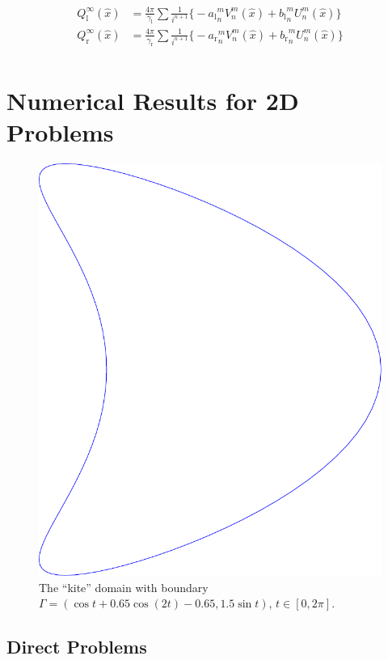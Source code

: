 \begin{align*}
  Q_\text{l}^\infty(\hat{x}) &= \frac{4\pi}{\gamma_\text{l}}\sum\frac{1}{i^{n+1}}\bigl\{-{a_\text{l}}_n^m  V_n^m(\hat{x}) + {b_\text{l}}_n^m U_n^m(\hat{x}) \bigr\} \\
  Q_\text{r}^\infty(\hat{x}) &= \frac{4\pi}{\gamma_\text{r}}\sum\frac{1}{i^{n+1}}\bigl\{-{a_\text{r}}_n^m  V_n^m(\hat{x}) + {b_\text{r}}_n^m U_n^m(\hat{x}) \bigr\} \\
\end{align*}

\chapter{Numerical Results for 2D Problems}

\begin{figure}
\centering
  \includegraphics[scale=0.3]{kite.pdf}
  \caption{The ``kite'' domain with boundary $\Gamma = (\cos t + 0.65\cos(2 t) - 0.65, 1.5\sin t)$, $t\in[0, 2\pi]$.}  
\label{fig:kite}
\end{figure}

\section{Direct Problems}
